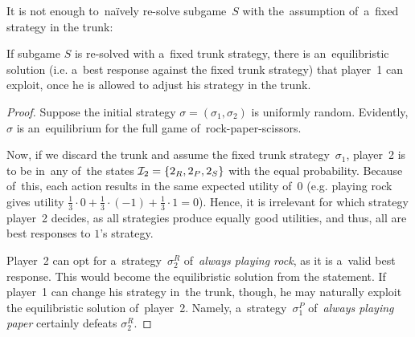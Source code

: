 It is not enough to~na{\"i}vely re-solve subgame~$S$ with the~assumption of~a~fixed strategy in the trunk:
\begin{claim}
  \label{claim:rps-subgame}
  If subgame $S$ is re-solved with a~fixed trunk strategy, there is an~equilibristic solution (i.e. a~best response against the fixed trunk strategy) that player~1 can exploit, once he is allowed to adjust his strategy in the trunk.
\end{claim}
\begin{proof}
  Suppose the initial strategy $\sigma = (\sigma_1, \sigma_2)$ is uniformly random\footnotemark{}.
  Evidently, $\sigma$ is an~equilibrium for the full game of~rock-paper-scissors.

  Now, if we discard the trunk and assume the fixed trunk strategy~$\sigma_1$, player~2 is to be in~any of~the states $\mathcal{I}_2 = \{2_R, 2_P, 2_S\}$ with the equal probability.
  Because of~this, each action results in the same expected utility of~$0$ (e.g. playing rock gives utility $\frac{1}{3} \cdot 0 + \frac{1}{3} \cdot (-1) + \frac{1}{3} \cdot 1 = 0$).
  Hence, it is irrelevant for which strategy player~2 decides, as all strategies produce equally good utilities, and thus, all are best responses to $1$'s strategy\footnotemark.

  Player~2 can opt for a~strategy~$\sigma^R_2$ of~\emph{always playing rock}, as it is a~valid best response.
  This would become the equilibristic solution from the statement.
  If player~1 can change his strategy in~the trunk, though, he may naturally exploit the equilibristic solution of~player~2.
  Namely, a~strategy~$\sigma^P_1$ of~\emph{always playing paper} certainly defeats $\sigma^R_2$.
\end{proof}
